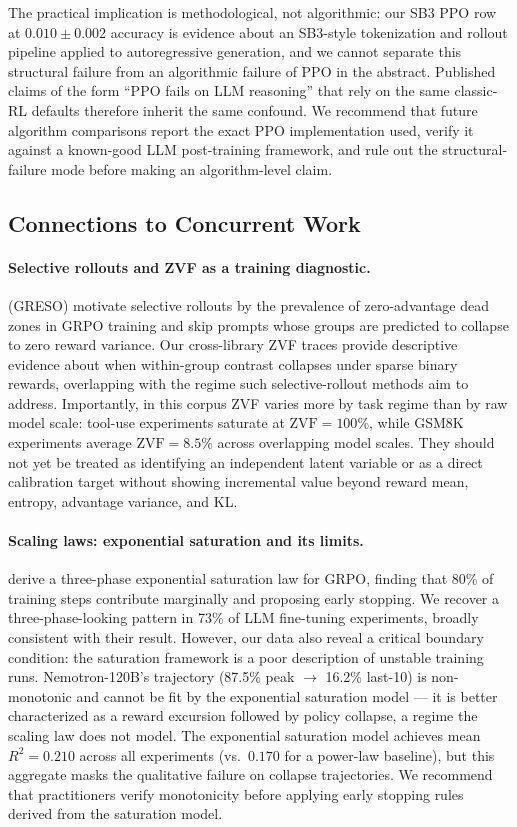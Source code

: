 \documentclass{article}
\begin{document}
The practical implication is methodological, not algorithmic: our
SB3 PPO row at $0.010 \pm 0.002$ accuracy is evidence about an
SB3-style tokenization and rollout pipeline applied to
autoregressive generation, and we cannot separate this structural
failure from an algorithmic failure of PPO in the abstract.
Published claims of the form ``PPO fails on LLM reasoning'' that
rely on the same classic-RL defaults therefore inherit the same
confound. We recommend that future algorithm comparisons report the
exact PPO implementation used, verify it against a known-good
LLM post-training framework, and rule out the structural-failure
mode before making an algorithm-level claim.

\subsection{Connections to Concurrent Work}
\label{sec:discuss_related}

\paragraph{Selective rollouts and ZVF as a training diagnostic.}
\citet{zhang2026greso} (GRESO) motivate selective rollouts by the prevalence of
zero-advantage dead zones in GRPO training and skip prompts whose groups are
predicted to collapse to zero reward variance.
Our cross-library ZVF traces provide descriptive evidence about when
within-group contrast collapses under sparse binary rewards, overlapping with
the regime such selective-rollout methods aim to address.
Importantly, in this corpus ZVF varies more by task regime than by raw model
scale: tool-use experiments saturate at $\text{ZVF} = 100\%$, while GSM8K
experiments average $\text{ZVF} = 8.5\%$ across overlapping model scales.
They should not yet be treated as identifying an independent latent variable
or as a direct calibration target without showing incremental value beyond
reward mean, entropy, advantage variance, and KL.

\paragraph{Scaling laws: exponential saturation and its limits.}
\citet{nimmaturi2025scalinglaws} derive a three-phase exponential saturation
law for GRPO, finding that 80\% of training steps contribute marginally and
proposing early stopping.
We recover a three-phase-looking pattern in 73\% of LLM fine-tuning
experiments, broadly consistent with their result.
However, our data also reveal a critical boundary condition: the saturation
framework is a poor description of unstable training runs.
Nemotron-120B's trajectory (87.5\% peak $\to$ 16.2\% last-10) is
non-monotonic and cannot be fit by the exponential saturation model ---
it is better characterized as a reward excursion followed by policy
collapse, a regime the scaling law does not model.
The exponential saturation model achieves mean $R^{2} = 0.210$ across all
experiments (vs.\ $0.170$ for a power-law baseline), but this aggregate
masks the qualitative failure on collapse trajectories.
We recommend that practitioners verify monotonicity before applying early
stopping rules derived from the saturation model.
\end{document}
